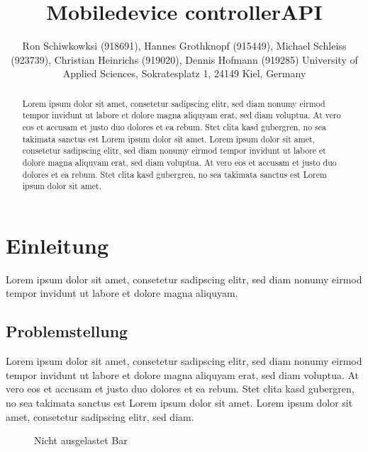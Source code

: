 \documentclass[a4paper]{spie}  %
\title{Mobiledevice controllerAPI} %
\author{ Ron Schiwkowksi  (918691), Hannes Grothknopf (915449), Michael Schleiss (923739), Christian Heinrichs (919020), Dennis Hofmann (919285)
\skiplinehalf
University of Applied Sciences, Sokratesplatz 1, 24149 Kiel, Germany
}
\begin{document}
 
  \maketitle 
\begin{abstract} %
Lorem ipsum dolor sit amet, consetetur sadipscing elitr, sed diam nonumy eirmod tempor invidunt ut labore et dolore magna aliquyam erat, sed diam voluptua. At vero eos et accusam et justo duo dolores et ea rebum. Stet clita kasd gubergren, no sea takimata sanctus est Lorem ipsum dolor sit amet. Lorem ipsum dolor sit amet, consetetur sadipscing elitr, sed diam nonumy eirmod tempor invidunt ut labore et dolore magna aliquyam erat, sed diam voluptua. At vero eos et accusam et justo duo dolores et ea rebum. Stet clita kasd gubergren, no sea takimata sanctus est Lorem ipsum dolor sit amet.
\end{abstract}


\section{Einleitung} %
Lorem ipsum dolor sit amet, consetetur sadipscing elitr, sed diam nonumy eirmod tempor invidunt ut labore et dolore magna aliquyam.

\subsection{Problemstellung}
Lorem ipsum dolor sit amet, consetetur sadipscing elitr, sed diam nonumy eirmod tempor invidunt ut labore et dolore magna aliquyam erat, sed diam voluptua. At vero eos et accusam et justo duo dolores et ea rebum. Stet clita kasd gubergren, no sea takimata sanctus est Lorem ipsum dolor sit amet. Lorem ipsum dolor sit amet, consetetur sadipscing elitr, sed diam.
\begin{figure}[h!]
	\centering
		\caption{Nicht ausgelastet Bar}
		\label{fig:FrontendInit}
\end{figure}
\end{document}
